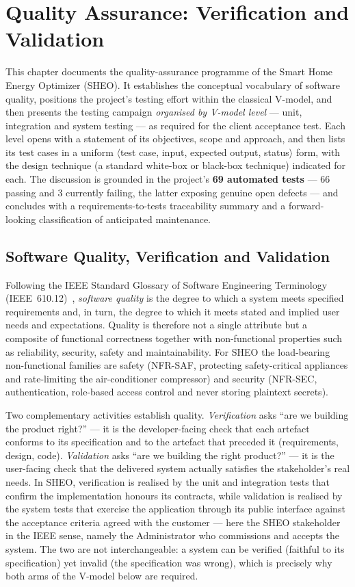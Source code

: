 \chapter{Quality Assurance: Verification and Validation}
\label{ch:quality}

This chapter documents the quality-assurance programme of the Smart Home Energy
Optimizer (SHEO). It establishes the conceptual vocabulary of software quality,
positions the project's testing effort within the classical V-model, and then
presents the testing campaign \emph{organised by V-model level} --- unit,
integration and system testing --- as required for the client acceptance test.
Each level opens with a statement of its objectives, scope and approach, and then
lists its test cases in a uniform $\langle$test case, input, expected output,
status$\rangle$ form, with the design technique (a standard white-box or black-box
technique) indicated for each. The discussion is grounded in the project's
\textbf{69 automated tests} --- 66 passing and 3 currently failing, the latter
exposing genuine open defects --- and concludes with a requirements-to-tests
traceability summary and a forward-looking classification of anticipated
maintenance.

\section{Software Quality, Verification and Validation}
\label{sec:qa-vv}

Following the IEEE Standard Glossary of Software Engineering Terminology
(IEEE~610.12)~\cite{ieee610}, \emph{software quality} is the degree to which a system meets
specified requirements and, in turn, the degree to which it meets stated and
implied user needs and expectations. Quality is therefore not a single attribute
but a composite of functional correctness together with non-functional
properties such as reliability, security, safety and maintainability. For SHEO
the load-bearing non-functional families are safety (NFR-SAF, protecting
safety-critical appliances and rate-limiting the air-conditioner compressor) and
security (NFR-SEC, authentication, role-based access control and never storing
plaintext secrets).

Two complementary activities establish quality. \emph{Verification} asks
``are we building the product right?'' --- it is the developer-facing check that
each artefact conforms to its specification and to the artefact that preceded it
(requirements, design, code). \emph{Validation} asks ``are we building the right
product?'' --- it is the user-facing check that the delivered system actually
satisfies the stakeholder's real needs. In SHEO, verification is realised by the
unit and integration tests that confirm the implementation honours its
contracts, while validation is realised by the system tests that
exercise the application through its public interface against the acceptance
criteria agreed with the customer --- here the SHEO stakeholder in the IEEE
sense, namely the Administrator who commissions and accepts the system. The two
are not interchangeable: a system can
be verified (faithful to its specification) yet invalid (the specification was
wrong), which is precisely why both arms of the V-model below are required.

